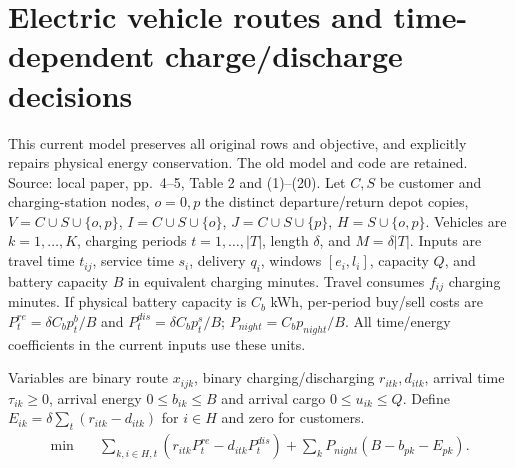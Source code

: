 \documentclass{article}
\begin{document}
\section*{Electric vehicle routes and time-dependent charge/discharge decisions}
This current model preserves all original rows and objective, and explicitly
repairs physical energy conservation. The old model and code are retained.
Source: local paper, pp.\ 4--5, Table 2 and (1)--(20).
Let $C,S$ be customer and charging-station nodes, $o=0,p$ the distinct
departure/return depot copies, $V=C\cup S\cup\{o,p\}$,
$I=C\cup S\cup\{o\}$, $J=C\cup S\cup\{p\}$, $H=S\cup\{o,p\}$.
Vehicles are $k=1,\ldots,K$, charging periods $t=1,\ldots,|T|$, length
$\delta$, and $M=\delta|T|$. Inputs are travel time $t_{ij}$, service time
$s_i$, delivery $q_i$, windows $[e_i,l_i]$, capacity $Q$, and battery
capacity $B$ in equivalent charging minutes. Travel consumes $f_{ij}$
charging minutes. If physical battery capacity is $C_b$ kWh, per-period
buy/sell costs are $P_t^{re}=\delta C_bp_t^b/B$ and
$P_t^{dis}=\delta C_bp_t^s/B$; $P_{night}=C_bp_{night}/B$.
All time/energy coefficients in the current inputs use these units.

Variables are binary route $x_{ijk}$, binary charging/discharging
$r_{itk},d_{itk}$, arrival time $\tau_{ik}\ge0$, arrival energy
$0\le b_{ik}\le B$ and arrival cargo $0\le u_{ik}\le Q$.
Define $E_{ik}=\delta\sum_t(r_{itk}-d_{itk})$ for $i\in H$ and zero
for customers.
\begin{align*}
\min\quad&
\sum_{k,i\in H,t}(r_{itk}P_t^{re}-d_{itk}P_t^{dis})
+\sum_kP_{night}(B-b_{pk}-E_{pk}).
\end{align*}
\end{document}
